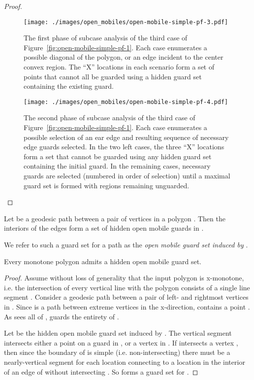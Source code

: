 \documentclass{cccg12}
\begin{document}
\begin{proof}
\begin{figure}[ht]
\centering
\texttt{[image: ./images/open\_mobiles/open-mobile-simple-pf-3.pdf]}
\caption{The first phase of subcase analysis of the third case of Figure~\ref{fig:open-mobile-simple-pf-1}.
Each case enumerates a possible diagonal of the polygon, or an edge incident to the center convex region.
The ``X'' locations in each scenario form a set of points that cannot all be guarded using a hidden guard set containing the existing guard.}
\label{fig:open-mobile-simple-pf-3}
\end{figure}

\begin{figure}[ht]
\centering
\texttt{[image: ./images/open\_mobiles/open-mobile-simple-pf-4.pdf]}
\caption{The second phase of subcase analysis of the third case of Figure~\ref{fig:open-mobile-simple-pf-1}.
Each case enumerates a possible selection of an ear edge and resulting sequence of necessary edge guards selected.
In the two left cases, the three ``X'' locations form a set that cannot be guarded using any hidden guard set containing the initial guard.
In the remaining cases, necessary guards are selected (numbered in order of selection) until a maximal guard set is formed with regions remaining unguarded.}
\label{fig:open-mobile-simple-pf-4}
\end{figure}

\end{proof}

\begin{obs}
\label{obs:geodesic-hidden}
Let  be a geodesic path between a pair of vertices  in a polygon .
Then the interiors of the edges  form a set of hidden open mobile guards in .
\end{obs}

We refer to such a guard set for a path  as the \emph{open mobile guard set induced by }.

\begin{lemma}
\label{lem:open-mobile-monotone}
Every monotone polygon admits a hidden open mobile guard set.
\end{lemma}

\begin{proof}
Assume without loss of generality that the input polygon  is x-monotone, i.e. the intersection of every vertical line with the polygon consists of a single line segment .
Consider a geodesic  path between a pair of left- and rightmost vertices in .
Since  is a path between extreme vertices in the x-direction,  contains a point .
As  sees all of ,  guards the entirety of .

Let  be the hidden open mobile guard set induced by .
The vertical segment  intersects either a point on a guard in , or a vertex in .
If  intersects a vertex , then since the boundary of  is simple (i.e. non-intersecting) there must be a nearly-vertical segment for each location  connecting  to a location in the interior of an edge of  without intersecting .
So  forms a guard set for .
\end{proof}
\end{document}
